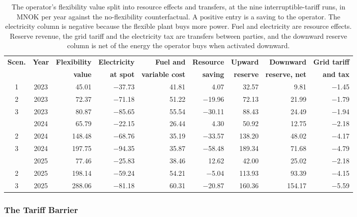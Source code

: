 \begin{table}[htbp]
\centering
\caption{The operator's flexibility value split into resource effects and transfers, at the nine interruptible-tariff runs, in MNOK per year against the no-flexibility counterfactual. A positive entry is a saving to the operator. The electricity column is negative because the flexible plant buys more power. Fuel and electricity are resource effects. Reserve revenue, the grid tariff and the electricity tax are transfers between parties, and the downward reserve column is net of the energy the operator buys when activated downward.}
\small
\begin{tabular}{c c r r r r r r r}
\toprule
\textbf{Scen.} & \textbf{Year} & \textbf{Flexibility} & \textbf{Electricity} & \textbf{Fuel and} & \textbf{Resource} & \textbf{Upward} & \textbf{Downward} & \textbf{Grid tariff} \\
 & & \textbf{value} & \textbf{at spot} & \textbf{variable cost} & \textbf{saving} & \textbf{reserve} & \textbf{reserve, net} & \textbf{and tax} \\
\midrule
1 & 2023 & 45.01 & $-$37.73 & 41.81 & 4.07 & 32.57 & 9.81 & $-$1.45 \\
2 & 2023 & 72.37 & $-$71.18 & 51.22 & $-$19.96 & 72.13 & 21.99 & $-$1.79 \\
3 & 2023 & 80.87 & $-$85.65 & 55.54 & $-$30.11 & 88.43 & 24.49 & $-$1.94 \\
\addlinespace
1 & 2024 & 65.79 & $-$22.15 & 26.44 & 4.30 & 50.92 & 12.75 & $-$2.18 \\
2 & 2024 & 148.48 & $-$68.76 & 35.19 & $-$33.57 & 138.20 & 48.02 & $-$4.17 \\
3 & 2024 & 197.75 & $-$94.35 & 35.87 & $-$58.48 & 189.34 & 71.68 & $-$4.79 \\
\addlinespace
1 & 2025 & 77.46 & $-$25.83 & 38.46 & 12.62 & 42.00 & 25.02 & $-$2.18 \\
2 & 2025 & 198.14 & $-$59.24 & 54.21 & $-$5.04 & 113.93 & 93.39 & $-$4.15 \\
3 & 2025 & 288.06 & $-$81.18 & 60.31 & $-$20.87 & 160.36 & 154.17 & $-$5.59 \\
\bottomrule
\end{tabular}
\label{tab:4.4 split}
\end{table}

\subsubsection{The Tariff Barrier}
\label{4-subsec:4.3.2 tariff barrier}

